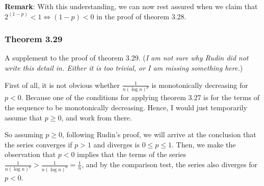 \documentclass{article}
\begin{document}
\textbf{Remark}: With this understanding, we can now rest assured when we claim that $2^{(1-p)}<1 \iff (1-p) < 0$ in the proof of theorem 3.28.

\subsubsection{Theorem 3.29}
A supplement to the proof of theorem 3.29. (\textit{I am not sure why Rudin did not write this detail in. Either it is too trivial, or I am missing something here.})

First of all, it is not obvious whether $\frac{1}{n(\log n)^p}$ is monotonically decreasing for $p<0$. Because one of the conditions for applying theorem 3.27 is for the terms of the sequence to be monotonically decreasing. Hence, I would just temporarily assume that $p\geq 0$, and work from there.

So assuming $p\geq 0$, following Rudin's proof, we will arrive at the conclusion that the series converges if $p > 1$ and diverges is $0\leq p \leq 1$. Then, we make the observation that $p < 0$ implies that the terms of the series $\frac{1}{n(\log n)^p} > \frac{1}{n(\log n)^0}=\frac{1}{n}$, and by the comparison test, the series also diverges for $p < 0$.
\end{document}
